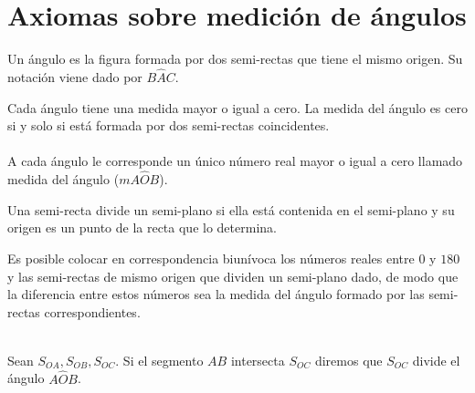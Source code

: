 \chapter{Axiomas sobre medición de ángulos}

\begin{tcolorbox}[colframe=white]
    \begin{def.}
	Un ángulo es la figura formada por dos semi-rectas que tiene el mismo origen. Su notación viene dado por $B\widehat{A}C$.
    \end{def.}
\end{tcolorbox}

\begin{tcolorbox}[colframe=white]
    \begin{axioma}
	Cada ángulo tiene una medida mayor o igual a cero. La medida del ángulo es cero si y solo si está formada por dos semi-rectas coincidentes.\\\\
	A cada ángulo le corresponde un único número real mayor o igual a cero llamado medida del ángulo ($m A\widehat{O}B$).
    \end{axioma}
\end{tcolorbox}

\begin{tcolorbox}[colframe=white]
    \begin{def.}
	Una semi-recta divide un semi-plano si ella está contenida en el semi-plano y su origen es un punto de la recta que lo determina.
    \end{def.}
\end{tcolorbox}

\begin{tcolorbox}[colframe=white]
    \begin{axioma}
	Es posible colocar en correspondencia biunívoca los números reales entre $0$ y $180$ y las semi-rectas de mismo origen que dividen un semi-plano dado, de modo que la diferencia entre estos números sea la medida del ángulo formado por las semi-rectas correspondientes.\\\\
    \end{axioma}
\end{tcolorbox}

\begin{tcolorbox}[colframe=white]
    \begin{def.}
	Sean $S_{OA}, S_{OB},S_{OC}$. Si el segmento $AB$ intersecta $S_{OC}$ diremos que $S_{OC}$ divide el ángulo $A\widehat{O}B$.
    \end{def.}
\end{tcolorbox}

